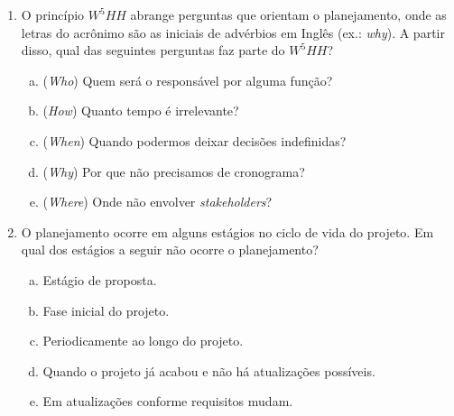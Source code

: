 \documentclass{beamer}
\begin{document}
\begin{frame}
    \begin{enumerate}
        \justifying
        \setcounter{enumi}{4}
        \item<1-2> O princípio $W^5HH$ abrange perguntas que orientam o planejamento, onde as letras do acrônimo são as iniciais de advérbios em Inglês (ex.: \textit{why}). A partir disso, qual das seguintes perguntas faz parte do $W^5HH$?
        \begin{enumerate}[a)]
            \justifying
            \item<1-2> \alert<2>{(\textit{Who}) Quem será o responsável por alguma função?}
            \item<1-2> (\textit{How}) Quanto tempo é irrelevante?
            \item<1-2> (\textit{When}) Quando podermos deixar decisões indefinidas?
            \item<1-2> (\textit{Why}) Por que não precisamos de cronograma?
            \item<1-2> (\textit{Where}) Onde não envolver \textit{stakeholders}?
        \end{enumerate}
        \item<3-4> O planejamento ocorre em alguns estágios no ciclo de vida do
        projeto. Em qual dos estágios a seguir não ocorre o planejamento?
        \begin{enumerate}[a)]
            \justifying
            \item<3-4> Estágio de proposta.
            \item<3-4> Fase inicial do projeto.
            \item<3-4> Periodicamente ao longo do projeto.
            \item<3-4> \alert<4>{Quando o projeto já acabou e não há atualizações possíveis}.
            \item<3-4> Em atualizações conforme requisitos mudam.
        \end{enumerate}
    \end{enumerate}
\end{frame}
\end{document}
